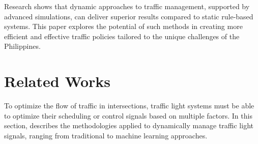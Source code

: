 Research shows that dynamic approaches to traffic management, supported by advanced simulations, can deliver superior results compared to static rule-based systems. This paper explores the potential of such methods in creating more efficient and effective traffic policies tailored to the unique challenges of the Philippines.


\section{Related Works}
To optimize the flow of traffic in intersections, traffic light systems must be able to optimize their scheduling or control signals based on multiple factors. In this section, describes the methodologies applied to dynamically manage traffic light signals, ranging from traditional to machine learning approaches.



